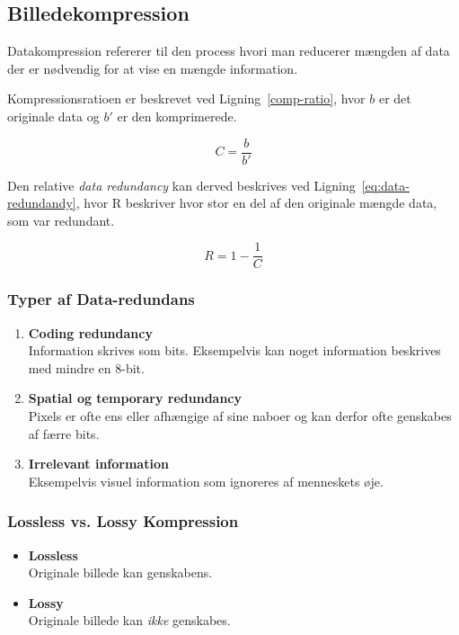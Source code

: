 \subsection{Billedekompression}

Datakompression refererer til den process hvori man reducerer mængden af data der er nødvendig for at vise en mængde information. 

Kompressionsratioen er beskrevet ved Ligning~\ref{comp-ratio}, hvor $b$ er det originale data og $b'$ er den komprimerede.

\begin{equation}\label{comp-ratio}
C = \frac{b}{b'}
\end{equation}

Den relative \textit{data redundancy} kan derved beskrives ved Ligning~\ref{eq:data-redundandy}, hvor R beskriver hvor stor en del af den originale mængde data, som var redundant.

\begin{equation}\label{eq:data-redundandy}
R = 1-\frac{1}{C}
\end{equation}

\subsubsection{Typer af Data-redundans}

\begin{enumerate}
	\item \textbf{Coding redundancy}\\
	Information skrives som bits. Eksempelvis kan noget information beskrives med mindre en 8-bit.
	
	\item \textbf{Spatial og temporary redundancy}\\
	Pixels er ofte ens eller afhængige af sine naboer og kan derfor ofte genskabes af færre bits.
	
	\item \textbf{Irrelevant information}\\
	Eksempelvis visuel information som ignoreres af menneskets øje.
\end{enumerate}

\subsubsection{Lossless vs. Lossy Kompression}

\begin{itemize}
	\item \textbf{Lossless}\\
	Originale billede kan genskabens. 
	
	\item \textbf{Lossy}\\
	Originale billede kan \textit{ikke} genskabes.
\end{itemize}
